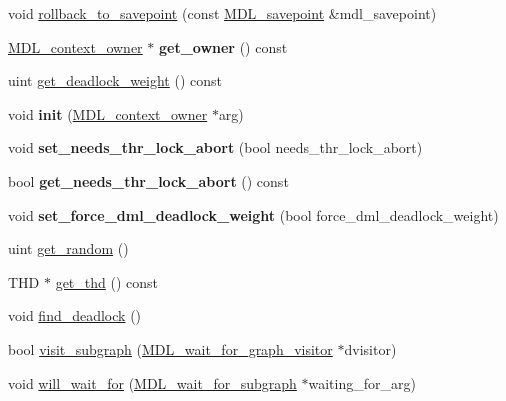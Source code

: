 \begin{DoxyCompactItemize}
\item 
void \mbox{\hyperlink{classMDL__context_a863ff94d0928e9720df30643835e4ef0}{rollback\+\_\+to\+\_\+savepoint}} (const \mbox{\hyperlink{classMDL__savepoint}{M\+D\+L\+\_\+savepoint}} \&mdl\+\_\+savepoint)
\item 
\mbox{\label{classMDL__context_aa476fbd9d7d0352352d551279e853314}} 
\mbox{\hyperlink{classMDL__context__owner}{M\+D\+L\+\_\+context\+\_\+owner}} $\ast$ {\bfseries get\+\_\+owner} () const
\item 
uint \mbox{\hyperlink{classMDL__context_a3563d6d05aeb758f495f44c123c5306b}{get\+\_\+deadlock\+\_\+weight}} () const
\item 
\mbox{\label{classMDL__context_a4c29aa7919001edcdfaa82bc360c65df}} 
void {\bfseries init} (\mbox{\hyperlink{classMDL__context__owner}{M\+D\+L\+\_\+context\+\_\+owner}} $\ast$arg)
\item 
\mbox{\label{classMDL__context_a74608d443dfc4754ce1b14c672a914f1}} 
void {\bfseries set\+\_\+needs\+\_\+thr\+\_\+lock\+\_\+abort} (bool needs\+\_\+thr\+\_\+lock\+\_\+abort)
\item 
\mbox{\label{classMDL__context_adbc1ba94d5bbd550b7e1d0ab88882060}} 
bool {\bfseries get\+\_\+needs\+\_\+thr\+\_\+lock\+\_\+abort} () const
\item 
\mbox{\label{classMDL__context_a39728ceab1f092a3bf1e8a4ec168f9bb}} 
void {\bfseries set\+\_\+force\+\_\+dml\+\_\+deadlock\+\_\+weight} (bool force\+\_\+dml\+\_\+deadlock\+\_\+weight)
\item 
uint \mbox{\hyperlink{classMDL__context_a6023ebdf937cfcbf9991b10945ad952f}{get\+\_\+random}} ()
\item 
T\+HD $\ast$ \mbox{\hyperlink{classMDL__context_a2260019c16977e8ed6aba3081f16348f}{get\+\_\+thd}} () const
\item 
void \mbox{\hyperlink{classMDL__context_aa0e75a7f44e5bc687620aff289a00f52}{find\+\_\+deadlock}} ()
\item 
bool \mbox{\hyperlink{classMDL__context_ab778763f11b187ab171213c9fa08846e}{visit\+\_\+subgraph}} (\mbox{\hyperlink{classMDL__wait__for__graph__visitor}{M\+D\+L\+\_\+wait\+\_\+for\+\_\+graph\+\_\+visitor}} $\ast$dvisitor)
\item 
void \mbox{\hyperlink{classMDL__context_afd74a4227cf8ddea993d96ee3be25331}{will\+\_\+wait\+\_\+for}} (\mbox{\hyperlink{classMDL__wait__for__subgraph}{M\+D\+L\+\_\+wait\+\_\+for\+\_\+subgraph}} $\ast$waiting\+\_\+for\+\_\+arg)

\end{DoxyCompactItemize}
